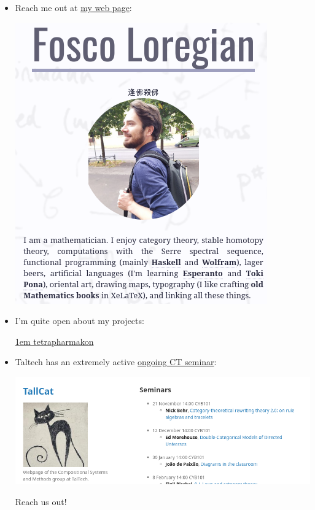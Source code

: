 \documentclass{beamer}
\begin{document}
%
\begin{frame}
\begin{itemize}
\item Reach me out at \href{http://tetrapharmakon.github.io}{my web page}:
\begin{center}
\href{http://tetrapharmakon.github.io}{
\includegraphics[width=.25\textwidth]{crop1.png}
}
\end{center}
\item I'm quite open about my projects:
\begin{center}
  \href{https://github.com/tetrapharmakon}{\faGithub \kern1em tetrapharmakon}
\end{center}
\item Taltech has an extremely active \href{https://compose.ioc.ee}{ongoing CT seminar}:
\begin{center}
\href{https://compose.ioc.ee}{
\includegraphics[width=.3\textwidth]{crop2.png}
}
\end{center}
Reach us out!
\end{itemize}
\end{frame}
%
%
%
%
%
\end{document}
